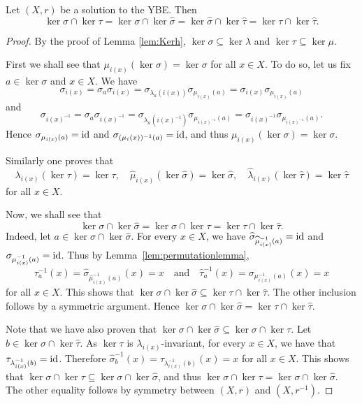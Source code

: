 \begin{lemma}\label{lem:Permutation}
	Let $(X,r)$ be a solution to the YBE. Then 
	\[\ker\sigma\cap\ker\tau=\ker\sigma\cap\ker\widehat{\sigma}=\ker\widehat{\sigma}\cap\ker\widehat{\tau}=\ker\tau\cap\ker\widehat{\tau}.\]
	\begin{proof}
	By the proof of Lemma \ref{lem:Kerh}, $\ker\sigma\subseteq\ker\lambda$ and $\ker\tau\subseteq\ker\mu$.
		
		First we shall see that $\mu_{i(x)}(\ker\sigma)=\ker\sigma$ for all $x\in X$. To do so, let us fix
		$a\in\ker\sigma$ and $x\in X$. We have
		\[\sigma_{i(x)}=\sigma_a\sigma_{i(x)}=\sigma_{\lambda_a(i(x))}\sigma_{\mu_{i(x)}(a)}=\sigma_{i(x)}\sigma_{\mu_{i(x)}(a)}\]
		and \[\sigma_{i(x)^{-1}}=\sigma_a\sigma_{i(x)^{-1}}=\sigma_{\lambda_a(i(x)^{-1})}\sigma_{\mu_{i(x)^{-1}}(a)}=
		\sigma_{i(x)^{-1}}\sigma_{\mu_{i(x)^{-1}}(a)}.\] Hence $\sigma_{\mu_{i(x)}(a)}=\operatorname{id}$ and
		$\sigma_{(\mu_i(x))^{-1}(a)}=\operatorname{id}$, and thus $\mu_{i(x)}(\ker\sigma)=\ker\sigma$.
		
		Similarly one proves that
		\[\lambda_{i(x)}(\ker\tau)=\ker\tau,\quad \widehat{\mu}_{i(x)}(\ker\widehat{\sigma})=\ker\widehat{\sigma},\quad
		\widehat{\lambda}_{i(x)}(\ker\widehat{\tau})=\ker\widehat{\tau}\] for all $x\in X$.
		
		Now, we shall see that \[\ker\sigma\cap\ker\widehat{\sigma}=\ker\sigma\cap\ker\tau=\ker\tau\cap\ker\widehat{\tau}.\]  
		Indeed, let $a\in\ker\sigma\cap\ker\widehat{\sigma}$. For every $x\in X$,
		we have $\widehat{\sigma}_{\widehat{\mu}_{i(x)}^{-1}(a)}=\operatorname{id}$ and $\sigma_{\mu_{i(x)}^{-1}(a)}=\operatorname{id}$. Thus by
		Lemma~\ref{lem:permutationlemma}, 
		\[\tau_a^{-1} (x)=\widehat{\sigma}_{\widehat{\mu}_{i(x)}^{-1}(a)}(x)=x\quad\text{and}\quad
		\widehat{\tau}_a^{-1}(x)=\sigma_{\mu_{i(x)}^{-1}(a)}(x)=x\] for all $x\in X$. This shows that $\ker\sigma\cap\ker\widehat{\sigma}\subseteq\ker\tau\cap\ker\widehat{\tau}$. The other inclusion follows by a symmetric argument. Hence $\ker\sigma\cap\ker\widehat{\sigma}=\ker\tau\cap\ker\widehat{\tau}$.
		
		Note that we have also proven that $\ker\sigma\cap\ker\widehat{\sigma}\subseteq\ker\sigma\cap\ker\tau$. Let $b\in\ker\sigma\cap\ker\widehat{\tau}$.
		As $\ker\tau$ is $\lambda_{i(x)}$-invariant, for every $x\in X$, we have that $\tau_{\lambda_{i(x)}^{-1}(b)}=\operatorname{id}$.
		Therefore $\widehat{\sigma}_b^{-1}(x)=\tau_{\lambda_{i(x)}^{-1}(b)}(x)=x$ for all $x\in X$. This shows that
		$\ker\sigma\cap\ker\tau\subseteq\ker\sigma\cap\ker\widehat{\sigma}$, and thus $\ker\sigma\cap\ker\tau=\ker\sigma\cap\ker\widehat{\sigma}$. The other equality follows by symmetry between $(X,r)$ and $(X,r^{-1})$.
	\end{proof}
\end{lemma}


